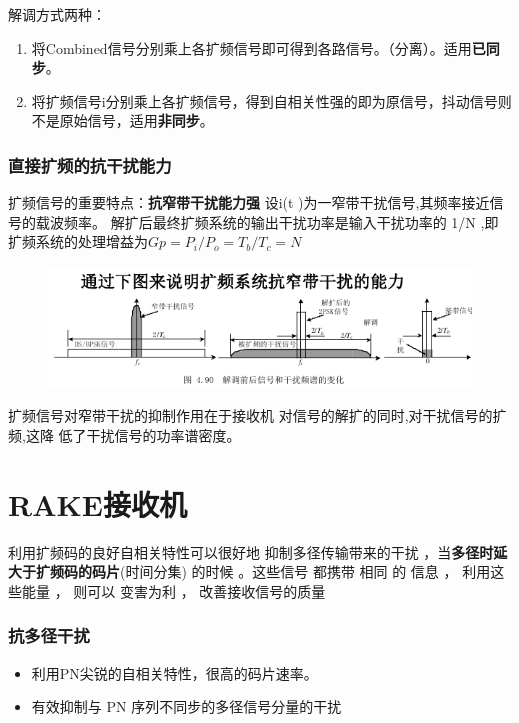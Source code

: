 解调方式两种：
\begin{enumerate}
	\item 将Combined信号分别乘上各扩频信号即可得到各路信号。（分离）。适用\textbf{已同步}。
	\item 将扩频信号i分别乘上各扩频信号，得到自相关性强的即为原信号，抖动信号则不是原始信号，适用\textbf{非同步}。
\end{enumerate}
\subsubsection{直接扩频的抗干扰能力}
扩频信号的重要特点：\textbf{抗窄带干扰能力强}
设i(t )为一窄带干扰信号,其频率接近信号的载波频率。
解扩后最终扩频系统的输出干扰功率是输入干扰功率的
1/N ,即扩频系统的处理增益为$ Gp = P_i/P_o = T_b /T_c = N $

\begin{figure}[htbp]
	\centering
	\includegraphics[width=0.9\linewidth]{figures/抗窄带能力}
	\caption{}
	\label{fig:}
\end{figure}
扩频信号对窄带干扰的抑制作用在于接收机
对信号的解扩的同时,对干扰信号的扩频,这降
低了干扰信号的功率谱密度。\\

\section{RAKE接收机}
 利用扩频码的良好自相关特性可以很好地
抑制多径传输带来的干扰 ，当\textbf{多径时延大于扩频码的码片}(时间分集)
的时候 。这些信号 都携带 相同 的
信息 ， 利用这些能量 ， 则可以
变害为利 ， 改善接收信号的质量 
\subsubsection{抗多径干扰}
\begin{itemize}
	\item 利用PN尖锐的自相关特性，很高的码片速率。
	\item  有效抑制与 PN 序列不同步的多径信号分量的干扰
\end{itemize}
